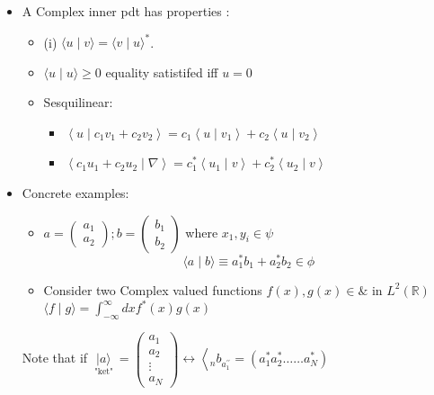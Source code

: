 \documentclass{article}
\begin{document}
\begin{itemize}
    \item A Complex inner pdt has properties :
\begin{itemize}
\item (i) $\langle u \mid v\rangle=\langle v \mid u\rangle^{*}$.
    \item $\langle u \mid u\rangle \geqslant 0$ equality satistifed iff $u=0$
    \item Sesquilinear:
    \begin{itemize}
        \item $\left\langle u \mid c_{1} v_{1}+c_{2} v_{2}\right\rangle=c_{1}\left\langle u \mid v_{1}\right\rangle+c_{2}\left\langle u \mid v_{2}\right\rangle$
        \item  $\left\langle c_{1} u_{1}+c_{2} u_{2} \mid \nabla\right\rangle=c_{1}^{*}\left\langle u_{1} \mid v\right\rangle+c_{2}^{*}\left\langle u_{2} \mid v\right\rangle$
    \end{itemize}
\end{itemize} 


\item Concrete examples: 

\begin{itemize}
    \item $a=\left(\begin{array}{l}a_{1} \\ a_{2}\end{array}\right) ; b=\left(\begin{array}{l}b_{1} \\ b_{2}\end{array}\right)$ where $x_{1}, y_{i} \in \psi$
    $$
\langle a \mid b\rangle \equiv a_{1}^{*} b_{1}+a_{2}^{*} b_{2} \in \phi
$$

\item  Consider two Complex valued functions $ f(x), g(x) \in \&$ in $L^{2}(\mathbb{R})$
$\langle f \mid g\rangle=\int_{-\infty}^{\infty} d x f^{*}(x) g(x)$
\end{itemize} 


Note that if $\underset{\text { "ket" }}{|a\rangle}=\left(\begin{array}{c}a_{1} \\ a_{2} \\ \vdots \\ a_{N}\end{array}\right) \leftrightarrow\left\langle_{n} b_{a_{1}^{\prime \prime}}=\left(a_{1}^{*} a_{2}^{*} \ldots \ldots a_{N}^{*}\right)\right.$


\end{itemize}
\end{document}
